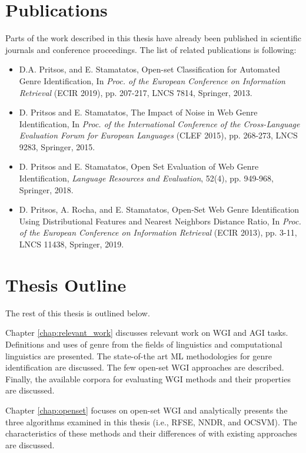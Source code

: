 \begin{itemize}
\section{Publications}

Parts of the work described in this thesis have already been published in scientific journals and conference proceedings. The list of related publications is following:

\begin{itemize}
\item D.A. Pritsos, and E. Stamatatos, Open-set Classification for Automated Genre Identification, In \textit{Proc. of the European Conference on Information Retrieval} (ECIR 2019), pp. 207-217, LNCS 7814, Springer, 2013.
\item D. Pritsos and E. Stamatatos, The Impact of Noise in Web Genre Identification, In \textit{Proc. of the International Conference of the Cross-Language Evaluation Forum for European Languages} (CLEF 2015), pp. 268-273, LNCS  9283, Springer, 2015.
\item D. Pritsos and E. Stamatatos, Open Set Evaluation of Web Genre Identification, \textit{Language Resources and Evaluation}, 52(4), pp. 949-968, Springer, 2018.
\item D. Pritsos, A. Rocha, and E. Stamatatos, Open-Set Web Genre Identification Using Distributional Features and Nearest Neighbors Distance Ratio, In \textit{Proc. of the European Conference on Information Retrieval} (ECIR 2013), pp. 3-11, LNCS 11438, Springer, 2019.
\end{itemize}

\section{Thesis Outline} \label{chap:Introduction:sec:thesis_outline}

The rest of this thesis is outlined below. 

Chapter \ref{chap:relevant_work} discusses relevant work on WGI and AGI tasks. Definitions and uses of genre from the fields of linguistics and computational linguistics are presented. The state-of-the art ML methodologies for genre identification are discussed. The few open-set WGI approaches are described. Finally, the available corpora for evaluating WGI methods and their properties are discussed.

Chapter \ref{chap:openset} focuses on open-set WGI and analytically presents the three algorithms examined in this thesis (i.e., RFSE, NNDR, and OCSVM). The characteristics of these methods and their differences of with existing approaches are discussed.


\end{itemize}
